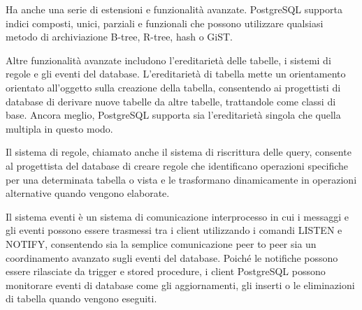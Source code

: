 Ha anche una serie di estensioni e funzionalit\`{a} avanzate. PostgreSQL supporta indici composti, unici, parziali e funzionali che possono utilizzare qualsiasi metodo di archiviazione B-tree, R-tree, hash o GiST.


Altre funzionalit\`{a} avanzate includono l'ereditariet\`{a} delle tabelle, i sistemi di regole e gli eventi del database. L'ereditarietà di tabella mette un orientamento orientato all'oggetto sulla creazione della tabella, consentendo ai progettisti di database di derivare nuove tabelle da altre tabelle, trattandole come classi di base. Ancora meglio, PostgreSQL supporta sia l'ereditarietà singola che quella multipla in questo modo.

Il sistema di regole, chiamato anche il sistema di riscrittura delle query, consente al progettista del database di creare regole che identificano operazioni specifiche per una determinata tabella o vista e le trasformano dinamicamente in operazioni alternative quando vengono elaborate.

Il sistema eventi è un sistema di comunicazione interprocesso in cui i messaggi e gli eventi possono essere trasmessi tra i client utilizzando i comandi LISTEN e NOTIFY, consentendo sia la semplice comunicazione peer to peer sia un coordinamento avanzato sugli eventi del database. Poiché le notifiche possono essere rilasciate da trigger e stored procedure, i client PostgreSQL possono monitorare eventi di database come gli aggiornamenti, gli inserti o le eliminazioni di tabella quando vengono eseguiti.


